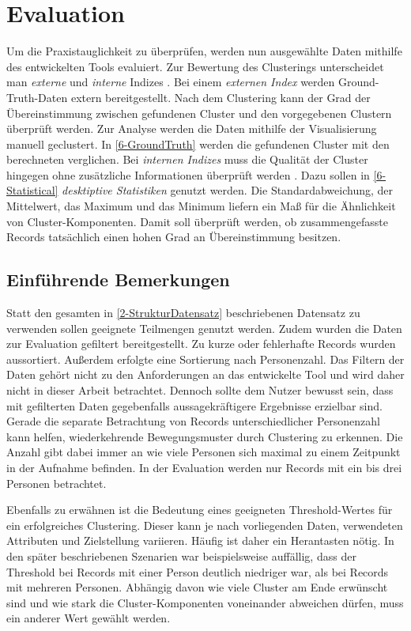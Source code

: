 \chapter{Evaluation}
\label{chapter6}
Um die Praxistauglichkeit zu überprüfen, werden nun ausgewählte Daten
mithilfe des entwickelten Tools evaluiert.
Zur Bewertung des Clusterings unterscheidet man \emph{externe}
und \emph{interne} Indizes \citep{aghabozorgi_time-series_2015, warren_liao_clustering_2005}.
Bei einem \emph{externen Index} werden Ground-Truth-Daten extern bereitgestellt.
Nach dem Clustering kann der Grad der Übereinstimmung zwischen gefundenen Cluster
und den vorgegebenen Clustern überprüft werden.
Zur Analyse werden die Daten mithilfe der Visualisierung manuell geclustert.
In \autoref{6-GroundTruth} werden die gefundenen Cluster mit den berechneten verglichen. 
Bei \emph{internen Indizes} muss die Qualität der Cluster hingegen
ohne zusätzliche Informationen überprüft werden \citep{aghabozorgi_time-series_2015, warren_liao_clustering_2005}.
Dazu sollen in \autoref{6-Statistical} \emph{desktiptive Statistiken} genutzt werden.
Die Standardabweichung, der Mittelwert, das Maximum und das Minimum liefern
ein Maß für die Ähnlichkeit von Cluster-Komponenten.
Damit soll überprüft werden,
ob zusammengefasste Records tatsächlich einen hohen Grad an Übereinstimmung besitzen.

\section{Einführende Bemerkungen}
\label{6-Bemerkungen}
Statt den gesamten in \autoref{2-StrukturDatensatz} beschriebenen Datensatz zu verwenden
sollen geeignete Teilmengen genutzt werden.
Zudem wurden die Daten zur Evaluation gefiltert bereitgestellt.
Zu kurze oder fehlerhafte Records wurden aussortiert.
Außerdem erfolgte eine Sortierung nach Personenzahl.
Das Filtern der Daten gehört nicht zu den Anforderungen an das entwickelte Tool
und wird daher nicht in dieser Arbeit betrachtet.
Dennoch sollte dem Nutzer bewusst sein,
dass mit gefilterten Daten gegebenfalls aussagekräftigere Ergebnisse erzielbar sind.
Gerade die separate Betrachtung von Records unterschiedlicher Personenzahl kann helfen,
wiederkehrende Bewegungsmuster durch Clustering zu erkennen.
Die Anzahl gibt dabei immer an wie viele Personen sich maximal
zu einem Zeitpunkt in der Aufnahme befinden.
In der Evaluation werden nur Records mit ein bis drei Personen betrachtet.

Ebenfalls zu erwähnen ist die Bedeutung eines geeigneten Threshold-Wertes für ein erfolgreiches Clustering.
Dieser kann je nach vorliegenden Daten, verwendeten Attributen und Zielstellung variieren.
Häufig ist daher ein {\glqq Herantasten\grqq} nötig.
In den später beschriebenen Szenarien war beispielsweise auffällig,
dass der Threshold bei Records mit einer Person deutlich niedriger war,
als bei Records mit mehreren Personen.
Abhängig davon wie viele Cluster am Ende erwünscht sind
und wie stark die Cluster-Komponenten voneinander abweichen dürfen,
muss ein anderer Wert gewählt werden.

